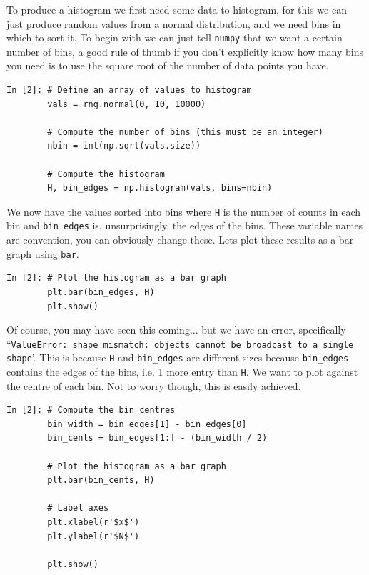 To produce a histogram we first need some data to histogram, for this we can just produce random values from a normal distribution, and we need bins in which to sort it. To begin with we can just tell \texttt{numpy} that we want a certain number of bins, a good rule of thumb if you don't explicitly know how many bins you need is to use the square root of the number of data points you have.

\begin{lstlisting}[style=PY]
In [2]: # Define an array of values to histogram
        vals = rng.normal(0, 10, 10000)
        
        # Compute the number of bins (this must be an integer)
        nbin = int(np.sqrt(vals.size))
        
        # Compute the histogram 
        H, bin_edges = np.histogram(vals, bins=nbin)
\end{lstlisting}

We now have the values sorted into bins where \texttt{H} is the number of counts in each bin and \texttt{bin\_edges} is, unsurprisingly, the edges of the bins. These variable names are convention, you can obviously change these. Lets plot these results as a bar graph using \texttt{bar}.

\begin{lstlisting}[style=PY]
In [2]: # Plot the histogram as a bar graph
        plt.bar(bin_edges, H)
        plt.show()
\end{lstlisting}

Of course, you may have seen this coming... but we have an error, specifically ``\texttt{ValueError: shape mismatch: objects cannot be broadcast to a single shape}'. This is because \texttt{H} and \texttt{bin\_edges} are different sizes because \texttt{bin\_edges} contains the edges of the bins, i.e. 1 more entry than \texttt{H}. We want to plot against the centre of each bin. Not to worry though, this is easily achieved.

\begin{lstlisting}[style=PY]
In [2]: # Compute the bin centres
        bin_width = bin_edges[1] - bin_edges[0]
        bin_cents = bin_edges[1:] - (bin_width / 2)
        
        # Plot the histogram as a bar graph
        plt.bar(bin_cents, H)
        
        # Label axes
        plt.xlabel(r'$x$')
        plt.ylabel(r'$N$')
        
        plt.show()
\end{lstlisting}

